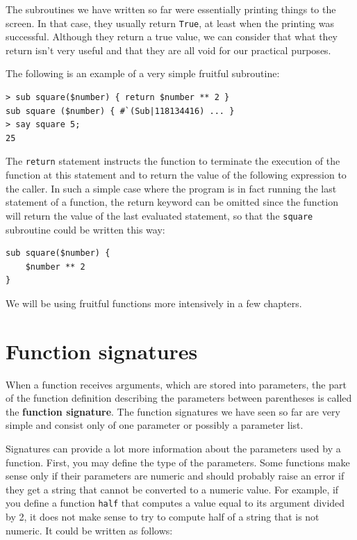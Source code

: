 The subroutines we have written so far were essentially 
printing things to the screen. In that case, they 
usually return {\tt True}, at least when the printing 
was successful. Although they return a true value, we can 
consider that what they return isn't very useful and that 
they are all void for our practical purposes.  

The following is an example of a very simple fruitful subroutine:

\begin{verbatim}
> sub square($number) { return $number ** 2 }
sub square ($number) { #`(Sub|118134416) ... }
> say square 5;
25
\end{verbatim}

The {\tt return} statement instructs the function to terminate 
the execution of the function at this statement and to return 
the value of the following expression to the caller. In such a simple 
case where the program is in fact running the last statement 
of a function, the return keyword can be omitted since the function 
will return the value of the last evaluated statement, so that the 
{\tt square} subroutine could be written this way:
\begin{verbatim}
sub square($number) { 
    $number ** 2 
}
\end{verbatim}

We will be using fruitful functions more intensively in a 
few chapters.

\section{Function signatures}

When a function receives arguments, which are stored into 
parameters, the part of the function 
definition describing the parameters between parentheses 
is called the {\bf function signature}. The function signatures 
we have seen so far are very simple and consist only of one 
parameter or possibly a parameter list.

Signatures can provide a lot more information about the 
parameters used by a function. First, you may define the 
type of the parameters. Some functions make sense only if their 
parameters are numeric and should probably raise an error if 
they get a string that cannot be converted to a numeric value. 
For example, if you define a function {\tt half} that computes 
a value equal to its argument divided by 2, it does not make 
sense to try to compute half of a string that is not numeric. 
It could be written as follows:

